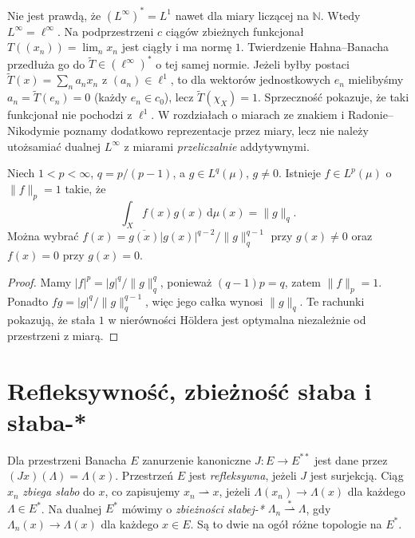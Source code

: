 \begin{uwaga}
Nie jest prawdą, że $(L^\infty)^*=L^1$ nawet dla
miary liczącej na $\mathbb N$. Wtedy $L^\infty=\ell^\infty$.
Na podprzestrzeni $c$ ciągów zbieżnych funkcjonał
$T((x_n))=\lim_nx_n$ jest ciągły i ma normę $1$.
Twierdzenie Hahna--Banacha przedłuża go do
$\widetilde T\in(\ell^\infty)^*$ o tej samej normie.
Jeżeli byłby postaci $\widetilde T(x)=\sum_n a_nx_n$
z $(a_n)\in\ell^1$, to dla wektorów jednostkowych $e_n$
mielibyśmy $a_n=\widetilde T(e_n)=0$ (każdy $e_n\in c_0$),
lecz $\widetilde T(\chi_X)=1$. Sprzeczność pokazuje,
że taki funkcjonał nie pochodzi z $\ell^1$.
W rozdziałach o miarach ze znakiem i Radonie--Nikodymie
poznamy dodatkowo reprezentacje przez miary, lecz nie
należy utożsamiać dualnej $L^\infty$ z miarami
\emph{przeliczalnie} addytywnymi.
\end{uwaga}

\begin{wniosek}
\label{cor:holder-sharp-15}
Niech $1<p<\infty$, $q=p/(p-1)$, a
$g\in L^q(\mu)$, $g\neq0$. Istnieje
$f\in L^p(\mu)$ o $\|f\|_p=1$ takie, że
\[
\int_X f(x)g(x)\,\mathrm d\mu(x)=\|g\|_q.
\]
Można wybrać
$f(x)=\overline{g(x)}|g(x)|^{q-2}/\|g\|_q^{q-1}$
przy $g(x)\neq0$ oraz $f(x)=0$ przy $g(x)=0$.
\end{wniosek}
\begin{proof}
Mamy $|f|^p=|g|^q/\|g\|_q^q$,
ponieważ $(q-1)p=q$, zatem $\|f\|_p=1$.
Ponadto $fg=|g|^q/\|g\|_q^{q-1}$, więc
jego całka wynosi $\|g\|_q$. Te rachunki
pokazują, że stała $1$ w nierówności Höldera
jest optymalna niezależnie od przestrzeni z miarą.
\end{proof}

\section{Refleksywność, zbieżność słaba i słaba-*}
\begin{definicja}
\label{def:weak-lp-15}
Dla przestrzeni Banacha $E$ zanurzenie kanoniczne
$J:E\to E^{**}$ jest dane przez $(Jx)(\Lambda)=\Lambda(x)$.
Przestrzeń $E$ jest \emph{refleksywna}, jeżeli $J$ jest
surjekcją. Ciąg $x_n$ \emph{zbiega słabo} do $x$,
co zapisujemy $x_n\rightharpoonup x$, jeżeli
$\Lambda(x_n)\to\Lambda(x)$ dla każdego $\Lambda\in E^*$.
Na dualnej $E^*$ mówimy o \emph{zbieżności słabej-*}
$\Lambda_n\overset{*}{\rightharpoonup}\Lambda$,
gdy $\Lambda_n(x)\to\Lambda(x)$ dla każdego $x\in E$.
Są to dwie na ogół różne topologie na $E^*$.
\end{definicja}


